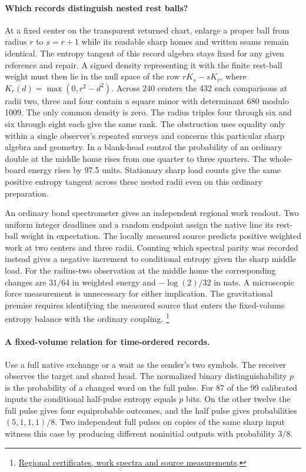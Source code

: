 \documentclass[11pt]{article}
\begin{document}
\paragraph{Which records distinguish nested rest balls?}
At a fixed center on the transparent returned chart, enlarge a proper
ball from radius $r$ to $s=r+1$ while its readable sharp homes and
written seams remain identical. The entropy tangent of this record
algebra stays fixed for any given reference and repair. A signed
density representing it with the finite rest-ball weight must then
lie in the null space of the row $rK_s-sK_r$, where
$K_r(d)=\max(0,r^2-d^2)$. Across 240 centers the 432 such comparisons
at radii two, three and four contain a square minor with determinant
680 modulo 1009. The only common density is zero. The radius triples
four through six and six through eight each give the same rank. The obstruction uses equality only
within a single observer's repeated surveys and concerns this particular
sharp algebra and geometry. In a blank-head control the probability of an
ordinary double at the middle home rises from one quarter to three
quarters. The whole-board energy rises by 97.5 units. Stationary sharp
load counts give the same positive entropy tangent across these nested
radii even on this ordinary preparation.

An ordinary bond spectrometer gives an independent regional work
readout. Two uniform integer deadlines and a random endpoint assign
the native line its rest-ball weight in expectation. The locally
measured source predicts positive weighted work at two centers and
three radii. Counting which spectral parity was recorded instead gives
a negative increment to conditional entropy given the sharp middle
load. For the radius-two observation at the middle home the corresponding
changes are $31/64$ in weighted energy and $-\log(2)/32$ in nats.
A microscopic force measurement is unnecessary for either implication.
The gravitational premise requires identifying the measured source
that enters the fixed-volume entropy balance with the ordinary
coupling.%
\footnote{\href{https://github.com/FloatingPragma/observer-patch-holography/blob/main/model/experiments/interval_echo_shell_flux/product_address/green_response/material_recoil/overlap_source/native_boundary/stock/aperture/NESTED_RESULTS.md}{Regional certificates, work spectra and source measurements}.}

\paragraph{A fixed-volume relation for time-ordered records.}
Use a full native exchange or a wait as the sender's two symbols.
The receiver observes the target and shared head. The normalized
binary distinguishability $p$ is the probability of a changed word
on the full pulse. For 87 of the 99 calibrated inputs the
conditional half-pulse entropy equals $p$ bits. On the other twelve
the full pulse gives four equiprobable outcomes, and the half pulse
gives probabilities $(5,1,1,1)/8$. Two independent full pulses on
copies of the same sharp input witness this case by producing
different noninitial outputs with probability $3/8$.
\end{document}
